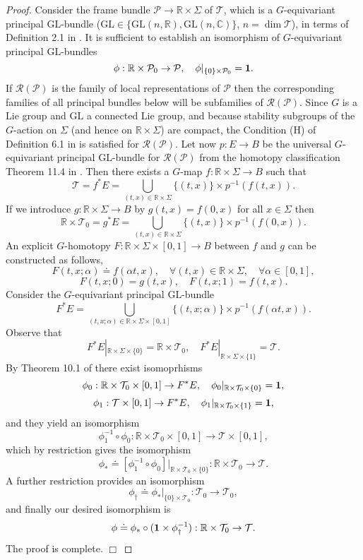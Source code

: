 \documentclass{article}
\begin{document}
\begin{proof} Consider the frame bundle $\mathcal{P}\to\mathbb{R}\times\Sigma$ of $\mathcal{T}$, which is a $G$-equivariant principal $\mathrm{GL}$-bundle ($\mathrm{GL}\in\{\mathrm{GL}(n,\mathbb{R}),\mathrm{GL}(n,\mathbb{C})\}$, $n=\dim\mathcal{T}$), in terms of Definition 2.1 in \cite{LueckUribe2014}. It is sufficient to establish an isomorphism of $G$-equivariant principal $\mathrm{GL}$-bundles
$$
\phi:\mathbb{R}\times\mathcal{P}_0\to\mathcal{P},\quad\phi|_{\{0\}\times\mathcal{P}_0}={\mathbf 1}.
$$
If $\mathcal{R}(\mathcal{P})$ is the family of local representations of $\mathcal{P}$ then the corresponding families of all principal bundles below will be subfamilies of $\mathcal{R}(\mathcal{P})$. Since $G$ is a Lie group and $\mathrm{GL}$ a connected Lie group, and because stability subgroups of the $G$-action on $\Sigma$ (and hence on $\mathbb{R}\times\Sigma$) are compact, the Condition (H) of Definition 6.1 in \cite{LueckUribe2014} is satisfied for $\mathcal{R}(\mathcal{P})$. Let now $p:E\to B$ be the universal $G$-equivariant principal $\mathrm{GL}$-bundle for $\mathcal{R}(\mathcal{P})$ from the homotopy classification Theorem 11.4 in \cite{LueckUribe2014}. Then there exists a $G$-map $f:\mathbb{R}\times\Sigma\to B$ such that
$$
\mathcal{T}=f^*E=\bigcup_{(t,x)\in\mathbb{R}\times\Sigma}\{(t,x)\}\times p^{-1}(f(t,x)).
$$
If we introduce $g:\mathbb{R}\times\Sigma\to B$ by $g(t,x)=f(0,x)$ for all $x\in\Sigma$ then
$$
\mathbb{R}\times\mathcal{T}_0=g^*E=\bigcup_{(t,x)\in\mathbb{R}\times\Sigma}\{(t,x)\}\times p^{-1}(f(0,x)).
$$
An explicit $G$-homotopy $F:\mathbb{R}\times\Sigma\times[0,1]\to B$ between $f$ and $g$ can be constructed as follows,
$$
F(t,x;\alpha)\doteq f(\alpha t,x),\quad\forall (t,x)\in\mathbb{R}\times\Sigma,\quad\forall\alpha\in[0,1],
$$
$$
F(t,x;0)=g(t,x),\quad F(t,x;1)=f(t,x).
$$
Consider the $G$-equivariant principal $\mathrm{GL}$-bundle
$$
F^*E=\bigcup_{(t,x;\alpha)\in\mathbb{R}\times\Sigma\times[0,1]}\{(t,x;\alpha)\}\times p^{-1}(f(\alpha t,x)).
$$
Observe that
$$
F^*E|_{\mathbb{R}\times\Sigma\times\{0\}}=\mathbb{R}\times\mathcal{T}_0,\quad F^*E|_{\mathbb{R}\times\Sigma\times\{1\}}=\mathcal{T}.
$$
By Theorem 10.1 of \cite{LueckUribe2014} there exist isomoprhisms
$$
\phi_0:\mathbb{R}\times\mathcal{T}_0\times[0,1]\to F^*E,\quad\phi_0|_{\mathbb{R}\times\mathcal{T}_0\times\{0\}}={\mathbf 1},
$$
$$
\phi_1:\mathcal{T}\times[0,1]\to F^*E,\quad\phi_1|_{\mathbb{R}\times\mathcal{T}_0\times\{1\}}={\mathbf 1},
$$
and they yield an isomorphism
$$
\phi_1^{-1}\circ\phi_0:\mathbb{R}\times\mathcal{T}_0\times[0,1]\to\mathcal{T}\times[0,1],
$$
which by restriction gives the isomorphism
$$
\phi_*\doteq[\phi_1^{-1}\circ\phi_0]|_{\mathbb{R}\times\mathcal{T}_0\times\{0\}}:\mathbb{R}\times\mathcal{T}_0\to\mathcal{T}.
$$
A further restriction provides an isomorphism
$$
\phi_\dagger\doteq\phi_*|_{\{0\}\times\mathcal{T}_0}:\mathcal{T}_0\to\mathcal{T}_0,
$$
and finally our desired isomorphism is
$$
\phi\doteq\phi_*\circ({\mathbf 1}\times\phi_\dagger^{-1}):\mathbb{R}\times\mathcal{T}_0\to\mathcal{T}.
$$
The proof is complete. $\Box$
\end{proof}
\end{document}
